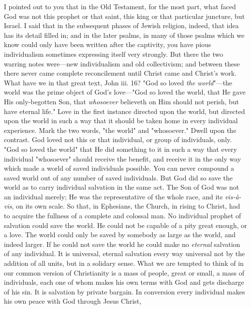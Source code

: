 \documentclass[12pt,letterpaper,oneside]{book}
\begin{document}
I pointed out to you that in the Old Testament, 
for the most part, what faced God was not 
this prophet or that saint, this king or that particular 
juncture, but Israel. I said that in the 
subsequent phases of Jewish religion, indeed, 
that idea has its detail filled in; and in the later 
psalms, in many of those psalms which we know 
could only have been written after the captivity, 
you have pious individualism sometimes expressing 
itself very strongly. But there the two warring 
notes were---new individualism and old collectivism; 
and between these there never came 
complete reconcilement until Christ came and 
Christ's work. What have we in that great text, 
John iii. 16? "God so loved \textit{the world}"---the world 
was the prime object of God's love---"God so 
loved the world, that He gave His only-begotten 
Son, that \textit{whosoever} believeth on Him should not 
perish, but have eternal life." Love in the first 
instance directed upon the world, but directed 
upon the world in such a way that it should be 
taken home in every individual experience. 
Mark the two words, "the world" and "whosoever." 
Dwell upon the contrast. God loved 
not this or that individual, or group of individuals, 
only. "God so loved the world" that 
He did something to it in such a way that every 
individual "whosoever" should receive the benefit, 
and receive it in the only way which made 
a world of saved individuals possible. You can 
never compound a saved world out of any 
number of saved individuals. But God did so 
save the world as to carry individual salvation 
in the same act. The Son of God was not an 
individual merely; He was the representative of 
the whole race, and its \textit{vis-\`{a}-vis}, on its own scale. 
So that, in Ephesians, the Church, in rising to 
Christ, had to acquire the fullness of a complete 
and colossal man. No individual prophet of salvation 
could save the world. He could not be 
capable of a pity great enough, or a love. The 
world could only be saved by somebody as large 
as the world, and indeed larger. If he could 
not save the world he could make no \textit{eternal} 
salvation of any individual. It is universal, 
eternal salvation every way universal not by 
the addition of all units, but in a solidary sense. 
What we are tempted to think of in our common 
version of Christianity is a mass of people, great 
or small, a mass of individuals, each one of 
whom makes his own terms with God and gets 
discharge of his sin. It is salvation by private 
bargain. In conversion every individual makes 
his own peace with God through Jesus Christ, 
\end{document}
